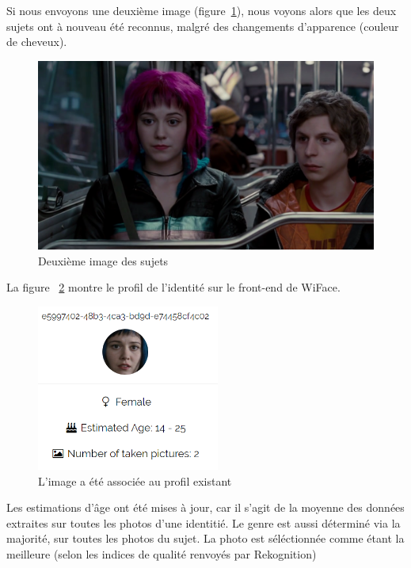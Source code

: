 Si nous envoyons une deuxième image (figure~\ref{fig:scott2}), nous voyons alors que les deux sujets ont à nouveau été reconnus, malgré des changements d'apparence (couleur de cheveux).

\begin{figure}[H]
	\centering
	\includegraphics[width=12cm]{images/facial_reco/scott2.png}
    \caption{Deuxième image des sujets}
	\label{fig:scott2}
\end{figure}

La figure ~\ref{fig:ramona_profile} montre le profil de l'identité sur le front-end de WiFace.
\begin{figure}[H]
	\centering
	\includegraphics[width=6cm]{images/facial_reco/ramona_profile.png}
    \caption{L'image a été associée au profil existant}
	\label{fig:ramona_profile}
\end{figure}

Les estimations d'âge ont été mises à jour, car il s'agit de la moyenne des données extraites sur toutes les photos d'une identitié.
Le genre est aussi déterminé via la majorité, sur toutes les photos du sujet. 
La photo est séléctionnée comme étant la meilleure (selon les indices de qualité renvoyés par Rekognition)